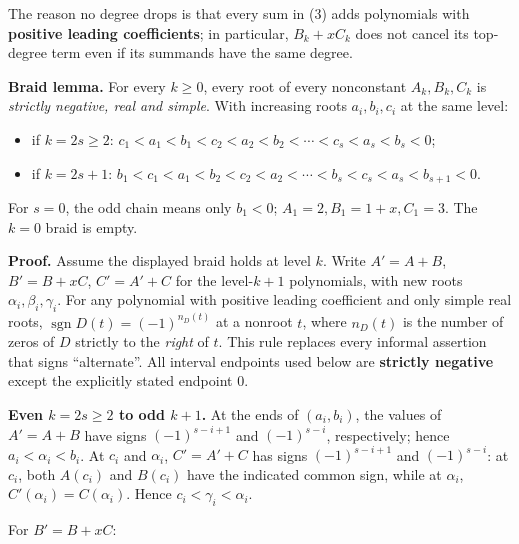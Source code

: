 \documentclass[
  10pt,
]{article}
\providecommand{\tightlist}{%
  \setlength{\itemsep}{0pt}\setlength{\parskip}{0pt}}
\begin{document}
The reason no degree drops is that every sum in (3) adds polynomials
with \textbf{positive leading coefficients}; in particular, \(B_k+xC_k\)
does not cancel its top-degree term even if its summands have the same
degree.

\textbf{Braid lemma.} For every \(k\ge0\), every root of every
nonconstant \(A_k,B_k,C_k\) is \emph{strictly negative, real and
simple}. With increasing roots \(a_i,b_i,c_i\) at the same level:

\begin{itemize}
\tightlist
\item
  if \(k=2s\ge2\): \(c_1<a_1<b_1<c_2<a_2<b_2<\cdots<c_s<a_s<b_s<0\);
\item
  if \(k=2s+1\):
  \(b_1<c_1<a_1<b_2<c_2<a_2<\cdots<b_s<c_s<a_s<b_{s+1}<0\).
\end{itemize}

For \(s=0\), the odd chain means only \(b_1<0\);
\(A_1=2,B_1=1+x,C_1=3\). The \(k=0\) braid is empty.

\textbf{Proof.} Assume the displayed braid holds at level \(k\). Write
\(A'=A+B\), \(B'=B+xC\), \(C'=A'+C\) for the level-\(k+1\) polynomials,
with new roots \(\alpha_i,\beta_i,\gamma_i\). For any polynomial with
positive leading coefficient and only simple real roots,
\(\operatorname{sgn}D(t)=(-1)^{n_D(t)}\) at a nonroot \(t\), where
\(n_D(t)\) is the number of zeros of \(D\) strictly to the \emph{right}
of \(t\). This rule replaces every informal assertion that signs
``alternate''. All interval endpoints used below are \textbf{strictly
negative} except the explicitly stated endpoint \(0\).

\textbf{Even \(k=2s\ge2\) to odd \(k+1\).} At the ends of \((a_i,b_i)\),
the values of \(A'=A+B\) have signs \((-1)^{s-i+1}\) and \((-1)^{s-i}\),
respectively; hence \(a_i<\alpha_i<b_i\). At \(c_i\) and \(\alpha_i\),
\(C'=A'+C\) has signs \((-1)^{s-i+1}\) and \((-1)^{s-i}\): at \(c_i\),
both \(A(c_i)\) and \(B(c_i)\) have the indicated common sign, while at
\(\alpha_i\), \(C'(\alpha_i)=C(\alpha_i)\). Hence
\(c_i<\gamma_i<\alpha_i\).

For \(B'=B+xC\):
\end{document}
